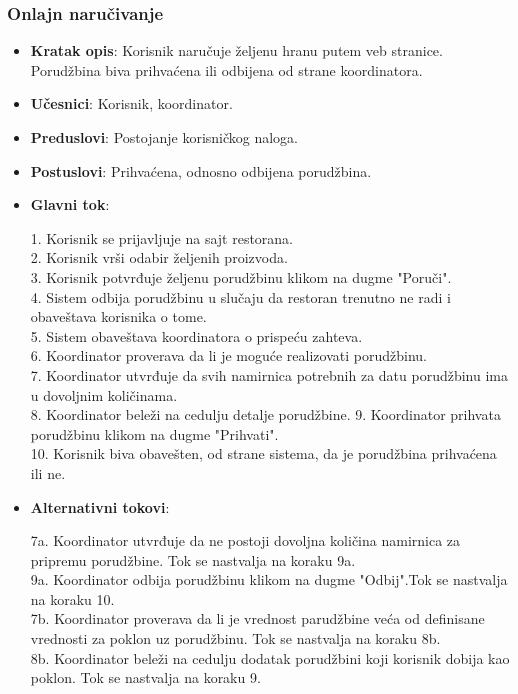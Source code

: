 \subsubsection{Onlajn naručivanje}
\begin{itemize}
    \item \textbf{Kratak opis}: Korisnik naručuje željenu hranu putem veb stranice. Porudžbina biva prihvaćena ili odbijena od strane koordinatora.
    \item \textbf{Učesnici}: Korisnik, koordinator.
    \item \textbf{Preduslovi}: Postojanje korisničkog naloga.
    \item \textbf{Postuslovi}: Prihvaćena, odnosno odbijena porudžbina.
    \item \textbf{Glavni tok}:
    
    1. Korisnik se prijavljuje na sajt restorana.\\
    2. Korisnik vrši odabir željenih proizvoda.\\
    3. Korisnik potvrđuje željenu porudžbinu klikom na dugme "Poruči".\\
    4. Sistem odbija porudžbinu u slučaju da restoran trenutno ne radi i obaveštava korisnika o tome.\\
    5. Sistem obaveštava koordinatora o prispeću zahteva.\\
    6. Koordinator proverava da li je moguće realizovati porudžbinu.\\
    7. Koordinator utvrđuje da svih namirnica potrebnih za datu porudžbinu ima u dovoljnim količinama.\\
    8. Koordinator beleži na cedulju detalje porudžbine. 
    9. Koordinator prihvata porudžbinu klikom na dugme "Prihvati".\\
    10. Korisnik biva obavešten, od strane sistema, da je porudžbina prihvaćena ili ne.
    
     \item \textbf{Alternativni tokovi}:
     
     7a. Koordinator utvrđuje da ne postoji dovoljna količina namirnica za pripremu porudžbine. Tok se nastvalja na koraku 9a.\\
     9a. Koordinator odbija porudžbinu klikom na dugme "Odbij".Tok se nastvalja na koraku 10.\\
     7b. Koordinator proverava da li je vrednost parudžbine veća od definisane vrednosti za poklon uz porudžbinu. Tok se nastvalja na koraku 8b.\\
     8b. Koordinator beleži na cedulju dodatak porudžbini koji korisnik dobija kao poklon. Tok se nastvalja na koraku 9.\\
    
\end{itemize}

